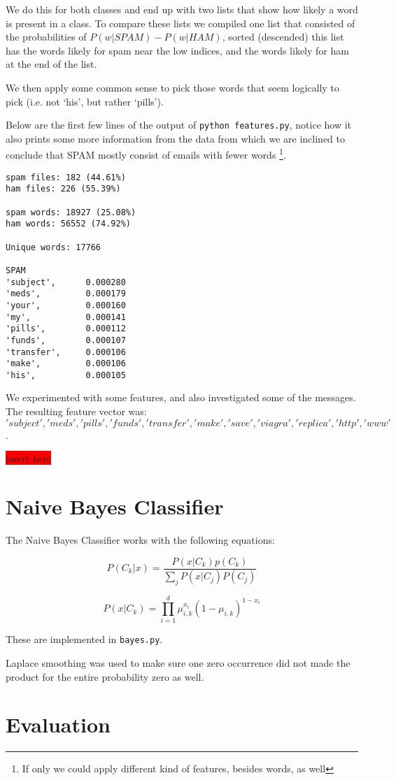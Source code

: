 \documentclass[a4paper,11pt]{article}
\newcommand{\todo}[1]{\colorbox{red}{\color{white}#1}}
\begin{document}
We do this for both classes and end up with two lists that show how likely 
a word is present in a class. To compare these lists we compiled one list
that consisted of the probabilities of $P(w|SPAM) - P(w|HAM)$, sorted 
(descended) this 
list has the words likely for spam near the low indices, and the words likely
for ham at the end of the list. 

We then apply some common sense to pick those words that seem logically to 
pick (i.e. not `his', but rather `pills').  

Below are the first few lines of the output of \texttt{python features.py}, 
notice how it also prints some more information from the data from which we 
are inclined to conclude that SPAM mostly consist of emails with fewer words \footnote{If only we could apply different kind of features, besides words, as well}. 
\begin{center}
\begin{verbatim}
spam files: 182 (44.61%)
ham files: 226 (55.39%)

spam words: 18927 (25.08%)
ham words: 56552 (74.92%)

Unique words: 17766

SPAM
'subject',      0.000280
'meds',         0.000179
'your',         0.000160
'my',           0.000141
'pills',        0.000112
'funds',        0.000107
'transfer',     0.000106
'make',         0.000106
'his',          0.000105
\end{verbatim}
\end{center}

We experimented with some features, and also investigated some of the 
messages. The resulting feature vector was: 
\['subject', 'meds', 'pills', 'funds', 'transfer', 'make', 'save', 'viagra', 'replica', 'http', 'www'\].

\todo{insert here}

\section{Naive Bayes Classifier}
The Naive Bayes Classifier works with the following equations: 

\begin{equation}
P(C_k|x) = \frac{P(x|C_k)p(C_k)}{\sum_j P(x|C_j)P(C_j)}
\label{eq:1}
\end{equation}

\begin{equation}
P(x|C_k)= \prod_{i=1}^d \mu^{x_i}_{i, k}(1 - \mu_{i,k})^{1-x_i}
\label{eq:2}
\end{equation}

These are implemented in \texttt{bayes.py}. 

Laplace smoothing was used to make sure one zero occurrence did not made the
product for the entire probability zero as well. 


\section{Evaluation}
\end{document}

